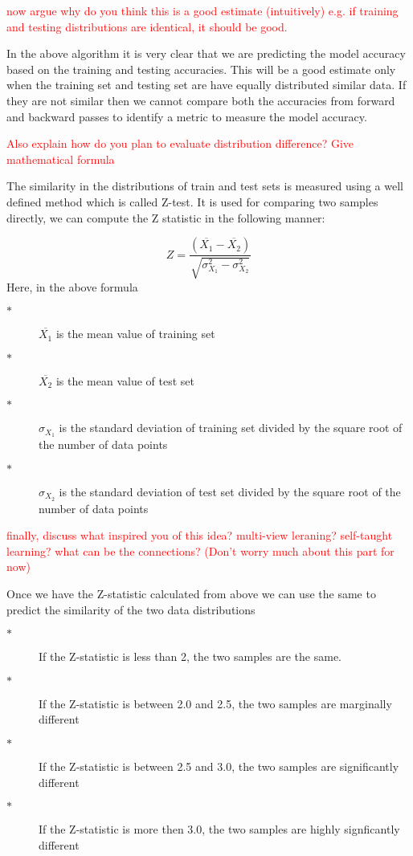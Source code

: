 \documentclass[a4paper,conference]{IEEEtran}
\begin{document}
\textcolor{red}{now argue why do you think this is a 
good estimate (intuitively) e.g. if training and testing 
distributions are identical, it should be good. }

In the above algorithm it is very clear that we are predicting the model accuracy based on the training and testing accuracies. This will be a good estimate only when the training set and testing set are have equally distributed similar data. If they are not similar then we cannot compare both the accuracies from forward and backward passes to identify a metric to measure the model accuracy.

\textcolor{red}{Also explain how do you plan to evaluate 
distribution difference? Give mathematical formula}

The similarity in the distributions of train and test sets is measured using a well defined method which is called Z-test. It is used for comparing two samples directly, we can compute the Z statistic in the following manner:

\[ Z = \frac{(\overline{X_1} - \overline{X_2})}{\sqrt{\sigma^2_{X_1} - \sigma^2_{X_2}}} \]
Here, in the above formula
\begin{description}
\item[$\ast$]$\overline{X_1}$ is the mean value of training set
\item[$\ast$]$\overline{X_2}$ is the mean value of test set
\item[$\ast$]$\sigma_{X_1}$ is the standard deviation of training set divided by the square root of the number of data points
\item[$\ast$]$\sigma_{X_2}$ is the standard deviation of test set divided by the square root of the number of data points
\end{description}
\textcolor{red}{finally, discuss what inspired you of 
this idea? multi-view leraning? self-taught learning?
what can be the connections? (Don't worry much about 
this part for now)} 

Once we have the Z-statistic calculated from above we can use the same to predict the similarity of the two data distributions

\begin{description}
\item[$\ast$]If the Z-statistic is less than 2, the two samples are the same. 
\item[$\ast$]If the Z-statistic is between 2.0 and 2.5, the two samples are marginally different 
\item[$\ast$]If the Z-statistic is between 2.5 and 3.0, the two samples are significantly different 
\item[$\ast$]If the Z-statistic is more then 3.0, the two samples are highly signficantly different
\end{description}
\end{document}
